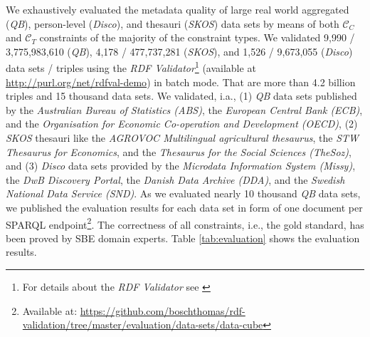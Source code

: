 \documentclass{llncs}
\begin{document}
We exhaustively evaluated the metadata quality of large real world aggregated (\emph{QB}), person-level (\emph{Disco}), and thesauri (\emph{SKOS}) data sets by means of both $\mathcal{C}_{C}$ and $\mathcal{C}_{T}$ constraints of the majority of the constraint types.
We validated 
9,990 / 3,775,983,610 (\emph{QB}),
4,178 / 477,737,281 (\emph{SKOS}), and 
1,526 / 9,673,055 (\emph{Disco}) data sets / triples using the \emph{RDF Validator}\footnote{For details about the \emph{RDF Validator} see \cite{BoschEckert2014-2}} (available at \url{http://purl.org/net/rdfval-demo}) in batch mode.
That are more than 4.2 billion triples and 15 thousand data sets.
We validated, i.a., 
(1) \emph{QB} data sets published by the \emph{Australian Bureau of Statistics (ABS)},
the \emph{European Central Bank (ECB)}, and the
\emph{Organisation for Economic Co-operation and Development (OECD)},
(2) \emph{SKOS} thesauri like the \emph{AGROVOC Multilingual agricultural thesaurus},
the \emph{STW Thesaurus for Economics}, and the
\emph{Thesaurus for the Social Sciences (TheSoz)}, and
(3) \emph{Disco} data sets provided by the \emph{Microdata Information System (Missy)}, 
the \emph{DwB Discovery Portal}, the
\emph{Danish Data Archive (DDA)}, and the
\emph{Swedish National Data Service (SND)}.
As we evaluated nearly 10 thousand \emph{QB} data sets, we published the evaluation results for each data set in form of one document per SPARQL endpoint\footnote{Available at: \url{https://github.com/boschthomas/rdf-validation/tree/master/evaluation/data-sets/data-cube}}.
The correctness of all constraints, i.e., the gold standard, has been proved by SBE domain experts.
Table \ref{tab:evaluation} shows the evaluation results.
\end{document}
